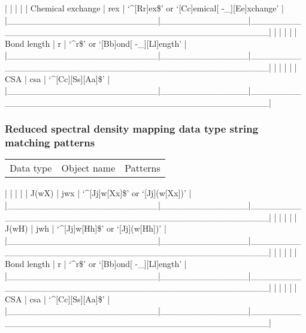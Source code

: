 |                        |              |                                                  |
| Chemical exchange      | rex          | `\^{}[Rr]ex\$' or `[Cc]emical[ -\_][Ee]xchange'       |
|\_\_\_\_\_\_\_\_\_\_\_\_\_\_\_\_\_\_\_\_\_\_\_\_|\_\_\_\_\_\_\_\_\_\_\_\_\_\_|\_\_\_\_\_\_\_\_\_\_\_\_\_\_\_\_\_\_\_\_\_\_\_\_\_\_\_\_\_\_\_\_\_\_\_\_\_\_\_\_\_\_\_\_\_\_\_\_\_\_|
|                        |              |                                                  |
| Bond length            | r            | `\^{}r\$' or `[Bb]ond[ -\_][Ll]ength'                 |
|\_\_\_\_\_\_\_\_\_\_\_\_\_\_\_\_\_\_\_\_\_\_\_\_|\_\_\_\_\_\_\_\_\_\_\_\_\_\_|\_\_\_\_\_\_\_\_\_\_\_\_\_\_\_\_\_\_\_\_\_\_\_\_\_\_\_\_\_\_\_\_\_\_\_\_\_\_\_\_\_\_\_\_\_\_\_\_\_\_|
|                        |              |                                                  |
| CSA                    | csa          | `\^{}[Cc][Ss][Aa]\$'                                 |
|\_\_\_\_\_\_\_\_\_\_\_\_\_\_\_\_\_\_\_\_\_\_\_\_|\_\_\_\_\_\_\_\_\_\_\_\_\_\_|\_\_\_\_\_\_\_\_\_\_\_\_\_\_\_\_\_\_\_\_\_\_\_\_\_\_\_\_\_\_\_\_\_\_\_\_\_\_\_\_\_\_\_\_\_\_\_\_\_\_|




\subsubsection{Reduced spectral density mapping data type string matching patterns}



\begin{tabular}{ccc}
Data type & Object name & Patterns \\
\end{tabular}
|                        |              |                                                  |
| J(wX)                  | jwx          | `\^{}[Jj]w[Xx]\$' or `[Jj](w[Xx])'                   |
|\_\_\_\_\_\_\_\_\_\_\_\_\_\_\_\_\_\_\_\_\_\_\_\_|\_\_\_\_\_\_\_\_\_\_\_\_\_\_|\_\_\_\_\_\_\_\_\_\_\_\_\_\_\_\_\_\_\_\_\_\_\_\_\_\_\_\_\_\_\_\_\_\_\_\_\_\_\_\_\_\_\_\_\_\_\_\_\_\_|
|                        |              |                                                  |
| J(wH)                  | jwh          | `\^{}[Jj]w[Hh]\$' or `[Jj](w[Hh])'                   |
|\_\_\_\_\_\_\_\_\_\_\_\_\_\_\_\_\_\_\_\_\_\_\_\_|\_\_\_\_\_\_\_\_\_\_\_\_\_\_|\_\_\_\_\_\_\_\_\_\_\_\_\_\_\_\_\_\_\_\_\_\_\_\_\_\_\_\_\_\_\_\_\_\_\_\_\_\_\_\_\_\_\_\_\_\_\_\_\_\_|
|                        |              |                                                  |
| Bond length            | r            | `\^{}r\$' or `[Bb]ond[ -\_][Ll]ength'                 |
|\_\_\_\_\_\_\_\_\_\_\_\_\_\_\_\_\_\_\_\_\_\_\_\_|\_\_\_\_\_\_\_\_\_\_\_\_\_\_|\_\_\_\_\_\_\_\_\_\_\_\_\_\_\_\_\_\_\_\_\_\_\_\_\_\_\_\_\_\_\_\_\_\_\_\_\_\_\_\_\_\_\_\_\_\_\_\_\_\_|
|                        |              |                                                  |
| CSA                    | csa          | `\^{}[Cc][Ss][Aa]\$'                                 |
|\_\_\_\_\_\_\_\_\_\_\_\_\_\_\_\_\_\_\_\_\_\_\_\_|\_\_\_\_\_\_\_\_\_\_\_\_\_\_|\_\_\_\_\_\_\_\_\_\_\_\_\_\_\_\_\_\_\_\_\_\_\_\_\_\_\_\_\_\_\_\_\_\_\_\_\_\_\_\_\_\_\_\_\_\_\_\_\_\_|




